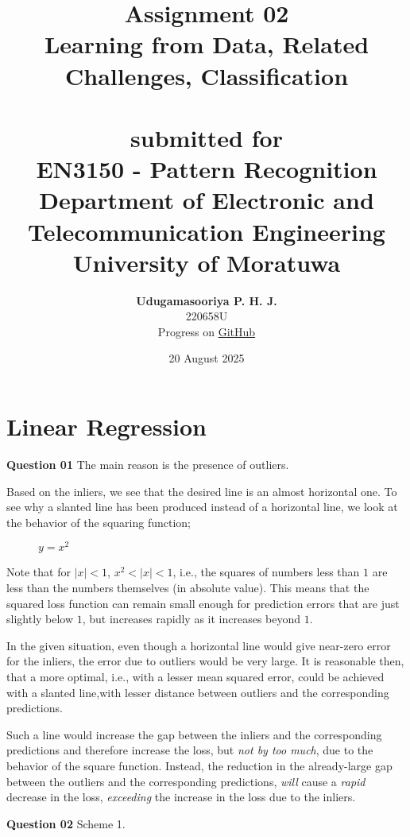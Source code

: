 \documentclass{article}[a4paper]
\title{
	\huge{\textbf{
		Assignment 02
	}}\\
	\Large{
		Learning from Data, Related Challenges, Classification
	}\\
	\large{\phantom{}}\\
	\large{
		submitted for
	}\\
	\LARGE{
		\textbf{EN3150 - Pattern Recognition}
	}\\
	\large{
		Department of Electronic and Telecommunication Engineering
	}
	\\
	\large{University of Moratuwa}
}
\author{
	\textbf{Udugamasooriya P. H. J.}\\
	220658U\\
	\small{Progress on \href{https://github.com/pulasthi-u/en3150-assignment02}{GitHub \extlink}}
}
\date{20 August 2025}
\begin{document}
	\maketitle

	\section{Linear Regression}

	\textbf{Question 01} The main reason is the presence of outliers.
	
	Based on the inliers, we see that the desired line is an almost horizontal one. To see why a slanted line has been produced instead of a horizontal line, we look at the behavior of the squaring function;
	\begin{figure}[H]
		\centering
		\caption{$y = x^2$}
	\end{figure}
	Note that for $|x| < 1$, $x^2 < |x| < 1$, i.e., the squares of numbers less than $1$ are less than the numbers themselves (in absolute value). This means that the squared loss function can remain small enough for prediction errors that are just slightly below $1$, but increases rapidly as it increases beyond $1$.

	In the given situation, even though a horizontal line would give near-zero error for the inliers, the error due to outliers would be very large. It is reasonable then, that a more optimal, i.e., with a lesser mean squared error, could be achieved with a slanted line,with lesser distance between outliers and the corresponding predictions.

	Such a line would increase the gap between the inliers and the corresponding predictions and therefore increase the loss, but \textit{not by too much}, due to the behavior of the square function. Instead, the reduction in the already-large gap between the outliers and the corresponding predictions, \textit{will} cause a \textit{rapid} decrease in the loss, \textit{exceeding} the increase in the loss due to the inliers.
	\medskip
	
	\textbf{Question 02} Scheme 1.
	
\end{document}
